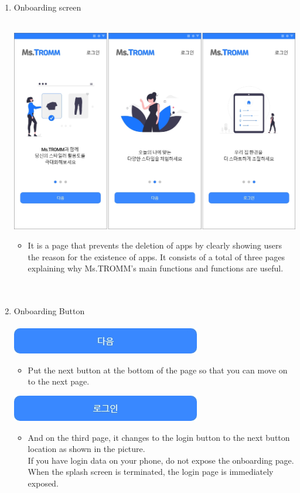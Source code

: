 \documentclass[conference]{IEEEtran}
\begin{document}
\begin{enumerate}
\begin{itemize}
    \end{itemize}
    \item Onboarding screen \\ \\
    \centerline{\includegraphics[scale=0.32]{온보딩.png}}
    \begin{itemize}
    \item[] It is a page that prevents the deletion of apps by clearly showing users the reason for the existence of apps. It consists of a total of three pages explaining why Ms.TROMM's main functions and functions are useful.\\ \\ \\
    \end{itemize}
    \item Onboarding Button \\ \\
    {\includegraphics[scale=0.75]{온보딩_다음.jpg}}
    \begin{itemize}
    \item[] Put the next button at the bottom of the page so that you can move on to the next page.
    \end{itemize}
    {\includegraphics[scale=0.75]{온보딩_로그인.jpg}}
    \begin{itemize}
    \item[] And on the third page, it changes to the login button to the next button location as shown in the picture. 
    \\ If you have login data on your phone, do not expose the onboarding page. When the splash screen is terminated, the login page is immediately exposed.
    \end{itemize}
    \end{enumerate}
    \break
\end{document}
